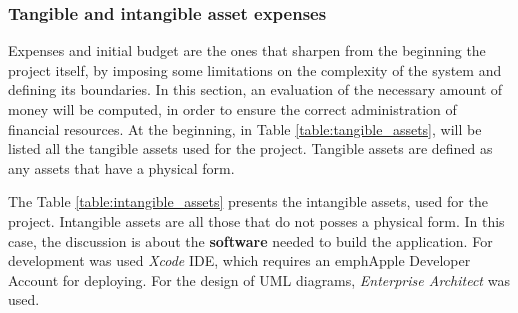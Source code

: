 \documentclass[12pt,a4paper,titlepage]{article}
\begin{document}
\subsubsection{Tangible and intangible asset expenses}
Expenses and initial budget are the ones that sharpen from the beginning the project itself, by imposing some limitations on the complexity of the system and defining its boundaries. In this section, an evaluation of the necessary amount of money will be computed, in order to ensure the correct administration of financial resources. At the beginning, in Table \ref{table:tangible_assets}, will be listed all the tangible assets used for the project. Tangible assets are defined as any assets that have a physical form. 

\begin{table}[H]
\centering
\caption{Tangible assets expenses}
\label{table:tangible_assets}
\end{table}

The Table \ref{table:intangible_assets} presents the intangible assets, used for the project. Intangible assets are all those that do not posses a physical form. In this case, the discussion is about the \textbf{software} needed to build the application. For development was used \emph{Xcode} IDE, which requires an emph{Apple Developer Account} for deploying. For the design of UML diagrams, \emph{Enterprise Architect} was used.

\begin{table}[H]
\centering
\caption{Intangible asset expenses}
\label{table:intangible_assets}
\end{table}
\end{document}
